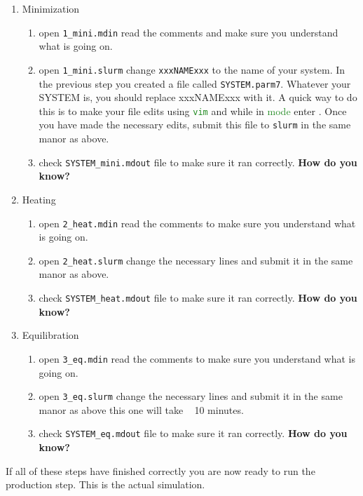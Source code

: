 \documentclass[11pt]{article}
\begin{document}
\begin{enumerate}
    \item Minimization
    \begin{enumerate}
        \item open \texttt{1\_mini.mdin} read the comments and make sure you understand what is going on.
        \item open \texttt{1\_mini.slurm} change \texttt{xxxNAMExxx} to the name of your system. In the previous step you created a file called \texttt{SYSTEM.parm7}. Whatever your SYSTEM is, you should replace xxxNAMExxx with it. A quick way to do this is to make your file edits using \textcolor{ForestGreen}{\texttt{vim}} and while in \textcolor{ForestGreen}{ mode} enter \textcolor{ForestGreen}{}. Once you have made the necessary edits, submit this file to \texttt{slurm} in the same manor as above.
        \item check \texttt{SYSTEM\_mini.mdout} file to make sure it ran correctly. \textbf{How do you know?}
    \end{enumerate}
    \item Heating
    \begin{enumerate}
        \item open \texttt{2\_heat.mdin} read the comments to make sure you understand what is going on.
        \item open \texttt{2\_heat.slurm} change the necessary lines and submit it in the same manor as above.
        \item check \texttt{SYSTEM\_heat.mdout} file to make sure it ran correctly. \textbf{How do you know?}
    \end{enumerate}
    \item Equilibration
    \begin{enumerate}
        \item open \texttt{3\_eq.mdin} read the comments to make sure you understand what is going on.
        \item open \texttt{3\_eq.slurm} change the necessary lines and submit it in the same manor as above this one will take ~ 10 minutes.
        \item check \texttt{SYSTEM\_eq.mdout} file to make sure it ran correctly. \textbf{How do you know?}
    \end{enumerate}
    
\end{enumerate}

If all of these steps have finished correctly you are now ready to run the production step. This is the actual simulation.
\end{document}
